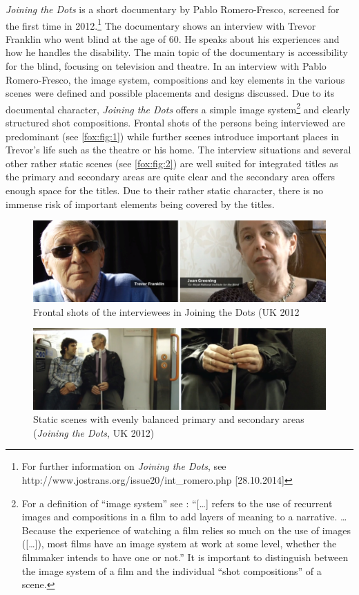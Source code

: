 \documentclass[output=paper]{langsci/langscibook}
\begin{document}
\textit{Joining the Dots} is a short documentary by Pablo Romero-Fresco, screened for the first time in 2012.\footnote{For further information on \textit{Joining the Dots}, see http://www.jostrans.org/issue20/int\_romero.php [28.10.2014]} The documentary shows an interview with Trevor Franklin who went blind at the age of 60. He speaks about his experiences and how he handles the disability. The main topic of the documentary is accessibility for the blind, focusing on television and theatre. In an interview with Pablo Romero-Fresco, the image system, compositions and key elements in the various scenes were defined and possible placements and designs discussed. Due to its documental character, \textit{Joining the Dots} offers a simple image system\footnote{For a definition of ``image system'' see \citet[21]{mercado2010}: ``[\ldots] refers to the use of recurrent images and compositions in a film to add layers of meaning to a narrative. \ldots Because the experience of watching a film relies so much on the use of images ([\ldots]), most films have an image system at work at some level, whether the filmmaker intends to have one or not.'' It is important to distinguish between the image system of a film and the individual ``shot compositions'' of a scene.} and clearly structured shot compositions. Frontal shots of the persons being interviewed are predominant (see \autoref{fox:fig:1}) while further scenes introduce important places in Trevor's life such as the theatre or his home. The interview situations and several other rather static scenes (see \autoref{fox:fig:2}) are well suited for integrated titles as the primary and secondary areas are quite clear and the secondary area offers enough space for the titles. Due to their rather static character, there is no immense risk of important elements being covered by the titles.


\begin{figure}
 \includegraphics[width=\textwidth]{figures/Fox1.png}
 \caption{Frontal shots of the interviewees in Joining the Dots (UK 2012}
  \label{fox:fig:1}
\end{figure}  

\begin{figure}
 \includegraphics[width=\textwidth]{figures/Fox2.png}
 \caption{Static scenes with evenly balanced primary and secondary areas (\textit{Joining the Dots}, UK 2012)}
 \label{fox:fig:2}
\end{figure} 
\end{document}
